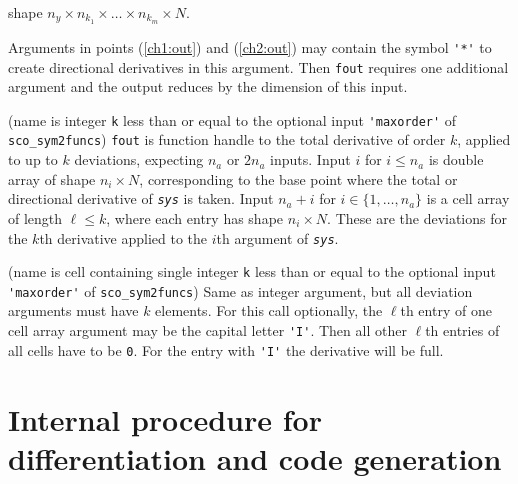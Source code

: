 \documentclass[11pt]{scrartcl}
\newcommand{\blist}[1]{\mbox{\lstinline!#1!}}
\newcommand{\genvar}[1]{\textit{\texttt{#1}}}
\begin{document}
\begin{compactenum}[(i)]
  shape $n_y\times n_{k_1}\times\ldots\times n_{k_m}\times N$.
\item Arguments in points (\ref{ch1:out}) and (\ref{ch2:out}) may
  contain the symbol \blist{'*'} to create directional derivatives in
  this argument. Then \blist{fout} requires one additional argument
  and the output reduces by the dimension of this input.
\item (name is integer \blist{k} less than or equal to the optional
  input \blist{'maxorder'} of \blist{sco_sym2funcs}) \blist{fout} is
  function handle to the total derivative of order $k$, applied to up
  to $k$ deviations, expecting $n_a$ or $2n_a$ inputs. Input $i$ for
  $i\leq n_a$ is double array of shape $n_i\times N$, corresponding to
  the base point where the total or directional derivative of
  \genvar{sys} is taken. Input $n_a+i$ for $i\in\{1,\ldots,n_a\}$ is a
  cell array of length $\ell\leq k$, where each entry has shape
  $n_i\times N$. These are the deviations for the $k$th derivative
  applied to the $i$th argument of \genvar{sys}.
\item (name is cell containing single integer \blist{k} less than or
  equal to the optional input \blist{'maxorder'} of
  \blist{sco_sym2funcs}) Same as integer argument, but all deviation
  arguments must have $k$ elements. For this call optionally, the
  $\ell$th entry of one cell array argument may be the capital letter
  \blist{'I'}. Then all other $\ell$th entries of all cells have to be
  \blist{0}. For the entry with \blist{'I'}  the derivative will be full.
\end{compactenum}


\section{Internal procedure for differentiation and code generation}
\label{sec:internal}
\end{document}
